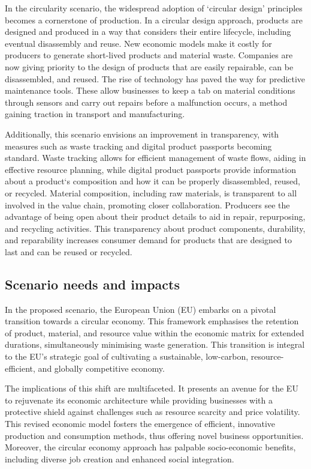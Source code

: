 In the circularity scenario, the widespread adoption of `circular design' principles becomes a cornerstone of production. In a circular design approach, products are designed and produced in a way that considers their entire lifecycle, including eventual disassembly and reuse. New economic models make it costly for producers to generate short-lived products and material waste. Companies are now giving priority to the design of products that are easily repairable, can be disassembled, and reused. The rise of technology has paved the way for predictive maintenance tools. These allow businesses to keep a tab on material conditions through sensors and carry out repairs before a malfunction occurs, a method gaining traction in transport and manufacturing.

Additionally, this scenario envisions an improvement in transparency, with measures such as waste tracking and digital product passports becoming standard. Waste tracking allows for efficient management of waste flows, aiding in effective resource planning, while digital product passports provide information about a product`s composition and how it can be properly disassembled, reused, or recycled. Material composition, including raw materials, is transparent to all involved in the value chain, promoting closer collaboration. Producers see the advantage of being open about their product details to aid in repair, repurposing, and recycling activities. This transparency about product components, durability, and reparability increases consumer demand for products that are designed to last and can be reused or recycled.


\subsectionEndline

\subsection{Scenario needs and impacts}

In the proposed scenario, the European Union (EU) embarks on a pivotal transition towards a circular economy. This framework emphasises the retention of product, material, and resource value within the economic matrix for extended durations, simultaneously minimising waste generation. This transition is integral to the EU's strategic goal of cultivating a sustainable, low-carbon, resource-efficient, and globally competitive economy.

The implications of this shift are multifaceted. It presents an avenue for the EU to rejuvenate its economic architecture while providing businesses with a protective shield against challenges such as resource scarcity and price volatility. This revised economic model fosters the emergence of efficient, innovative production and consumption methods, thus offering novel business opportunities. Moreover, the circular economy approach has palpable socio-economic benefits, including diverse job creation and enhanced social integration.

